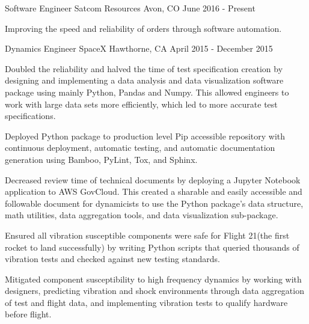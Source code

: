 

\begin{cventries}

  \cventry
    {Software Engineer} %
    {Satcom Resources} %
    {Avon, CO} %
    {June 2016 - Present} %
    {
      \begin{cvitems} %
        \item {Improving the speed and reliability of orders through software automation.}
      \end{cvitems}
    }

  \cventry
    {Dynamics Engineer} %
    {SpaceX} %
    {Hawthorne, CA} %
    {April 2015 - December 2015} %
    {
      \begin{cvitems} %
        \item {Doubled the reliability and halved the time of test specification creation by designing and implementing a data analysis and data visualization software package using mainly Python, Pandas and Numpy. This allowed engineers to work with large data sets more efficiently, which led to more accurate test specifications.}
        \item {Deployed Python package to production level Pip accessible repository with continuous deployment, automatic testing, and automatic documentation generation using Bamboo, PyLint, Tox, and Sphinx.}
        \item {Decreased review time of technical documents by deploying a Jupyter Notebook application to AWS GovCloud. This created a sharable and easily accessible and followable document for dynamicists to use the Python package’s data structure, math utilities, data aggregation tools, and data visualization sub-package.}
        \item {Ensured all vibration susceptible components were safe for Flight 21(the first rocket to land successfully) by writing Python scripts that queried thousands of vibration tests and checked against new testing standards.}
        \item {Mitigated component susceptibility to high frequency dynamics by working with designers, predicting vibration and shock environments through data aggregation of test and flight data, and implementing vibration tests to qualify hardware before flight.}
      \end{cvitems}
    }


\end{cventries}

